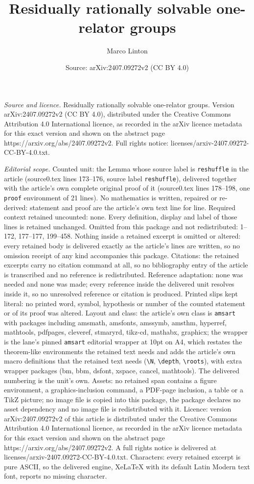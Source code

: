 \documentclass[10pt,a4paper]{amsart}
\title[Residually rationally solvable one-relator groups]{Residually rationally solvable one-relator groups}
\author{Marco Linton}
\date{Source: arXiv:2407.09272v2 (CC BY 4.0)}
\begin{document}
\maketitle

\noindent\emph{Source and licence.} Residually rationally solvable one-relator groups. Version arXiv:2407.09272v2 (CC BY 4.0), distributed under the Creative Commons Attribution 4.0 International licence, as recorded in the arXiv licence metadata for this exact version and shown on the abstract page https://arxiv.org/abs/2407.09272v2. Full rights notice: licenses/arxiv-2407.09272-CC-BY-4.0.txt.\par\smallskip

\noindent\textit{Editorial scope.} Counted unit: the Lemma whose source label is \texttt{reshuffle} in the article (source0.tex lines 173--176, source label \texttt{reshuffle}), delivered together with the article's own complete original proof of it (source0.tex lines 178--198, one \texttt{proof} environment of 21 lines). No mathematics is written, repaired or re-derived: statement and proof are the article's own text line for line. Required context retained uncounted: none. Every definition, display and label of those lines is retained unchanged. Omitted from this package and not redistributed: 1--172, 177--177, 199--458. Nothing inside a retained excerpt is omitted or altered: every retained body is delivered exactly as the article's lines are written, so no omission receipt of any kind accompanies this package. Citations: the retained excerpts carry no citation command at all, so no bibliography entry of the article is transcribed and no reference is redistributed. Reference adaptation: none was needed and none was made; every reference inside the delivered unit resolves inside it, so no unresolved reference or citation is produced. Printed slips kept literal: no printed word, symbol, hypothesis or number of the counted statement or of its proof was altered. Layout and class: the article's own class is \texttt{amsart} with packages including amsmath, amsfonts, amssymb, amsthm, hyperref, mathtools, pdfpages, cleveref, stmaryrd, tikz-cd, mathabx, graphicx; the wrapper is the lane's pinned \texttt{amsart} editorial wrapper at 10pt on A4, which restates the theorem-like environments the retained text needs and adds the article's own macro definitions that the retained text needs (\texttt{\textbackslash N}, \texttt{\textbackslash depth}, \texttt{\textbackslash roots}), with extra wrapper packages (bm, bbm, dsfont, xspace, cancel, mathtools). The delivered numbering is the unit's own. Assets: no retained span contains a figure environment, a graphics-inclusion command, a PDF-page inclusion, a table or a TikZ picture; no image file is copied into this package, the package declares no asset dependency and no image file is redistributed with it. Licence: version arXiv:2407.09272v2 of this article is distributed under the Creative Commons Attribution 4.0 International licence, as recorded in the arXiv licence metadata for this exact version and shown on the abstract page https://arxiv.org/abs/2407.09272v2. A full rights notice is delivered at licenses/arxiv-2407.09272-CC-BY-4.0.txt. Characters: every retained excerpt is pure ASCII, so the delivered engine, XeLaTeX with its default Latin Modern text font, reports no missing character.
\end{document}
